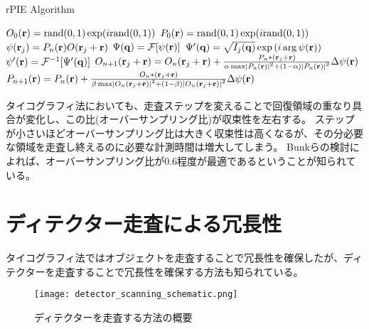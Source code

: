\begin{algorithm}[!ht]
\caption{rPIE Algorithm}         
\label{alg:rpie}                          
\begin{algorithmic}
    \STATE $O_0(\mathbf{r}) = \mathrm{rand}(0,1) \exp(i \mathrm{rand}(0,1) )$
    \STATE $P_0(\mathbf{r}) = \mathrm{rand}(0,1) \exp(i \mathrm{rand}(0,1) )$
        \STATE $\psi(\mathbf{r}_j) = P_n(\mathbf{r}) O(\mathbf{r}_j + \mathbf{r})$
        \STATE $\Psi(\mathbf{q}) = \mathcal F [\psi(\mathbf{r})]$
        \STATE $\Psi'(\mathbf{q}) = \sqrt{I_j(\mathbf{q})} \exp\left( i \arg \psi(\mathbf{r}) \right)$ 
        \STATE $\psi'(\mathbf{r}) = \mathcal F^{-1} [\Psi'(\mathbf{q})]$
        \STATE $O_{n+1}(\mathbf{r}_j + \mathbf{r}) 
          = O_n(\mathbf{r}_j + \mathbf{r}) + \frac{P_n*(\mathbf{r}_j + \mathbf{r})}
          {\alpha \max \left| P_n(\mathbf{r}) \right|^2 + (1-\alpha) \left| P_n(\mathbf{r}) \right|^2}
          \Delta\psi(\mathbf{r})$
        \STATE $P_{n+1}(\mathbf{r})
          = P_n(\mathbf{r}) + \frac{O_n*(\mathbf{r}_j + \mathbf{r})}
          {\beta \max \left| O_n(\mathbf{r}_j + \mathbf{r}) \right|^2 + (1-\beta) \left| O_n(\mathbf{r}_j + \mathbf{r}) \right|^2}
          \Delta\psi(\mathbf{r})$
      \ENDFOR
    \ENDFOR
\end{algorithmic}
\end{algorithm}

タイコグラフィ法においても、走査ステップを変えることで回復領域の重なり具合が変化し、この比(オーバーサンプリング比)が収束性を左右する。
ステップが小さいほどオーバーサンプリング比は大きく収束性は高くなるが、その分必要な領域を走査し終えるのに必要な計測時間は増大してしまう。
Bunkらの検討によれば、オーバーサンプリング比が0.6程度が最適であるということが知られている。\cite{Bunk2008}

\clearpage
\newpage

\section{ディテクター走査による冗長性}
\label{chap3_detector_scanninc_introduction}

タイコグラフィ法ではオブジェクトを走査することで冗長性を確保したが、ディテクターを走査することで冗長性を確保する方法も知られている。

\begin{figure}[!ht]
\centering
\texttt{[image: detector\_scanning\_schematic.png]}
\caption{ディテクターを走査する方法の概要}
\label{fig:detector_scanning_schematic}
\end{figure}

